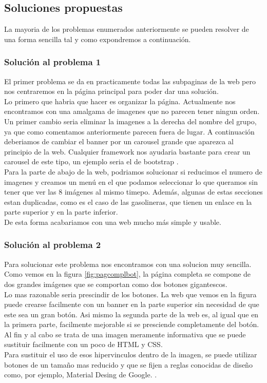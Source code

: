 \documentclass[a4paper,11pt]{article}
\begin{document}
\subsection{Soluciones propuestas}
La mayoria de los problemas enumerados anteriormente se pueden resolver de una forma sencilla tal y como expondremos a continuación.

\subsubsection{Solución al problema 1}
El primer problema se da en practicamente todas las subpaginas de la web pero nos centraremos en la página principal para poder dar una solución.\\
Lo primero que habria que hacer es organizar la página. Actualmente nos encontramos con una amalgama de imagenes que no parecen tener ningun orden.
Un primer cambio seria eliminar la imagenes a la derecha del nombre del grupo, ya que como comentamos anteriormente parecen fuera de lugar.
A continuación deberiamos de cambiar el banner por un carousel grande que aparezca al principio de la web. Cualquier framework nos ayudaria bastante para crear un carousel de este tipo, un ejemplo seria el de bootstrap \cite{bootstrapcarr}.\\
Para la parte de abajo de la web, podriamos solucionar si reducimos el numero de imagenes y creamos un menú en el que podamos seleccionar lo que queramos sin tener que ver las 8 imágenes al mismo timepo. Además, algunas de estas secciones estan duplicadas, como es el caso de las gasolineras, que tienen un enlace en la parte superior y en la parte inferior.\\
De esta forma acabariamos con una web mucho más simple y usable.



\subsubsection{Solución al problema 2}
Para solucionar este problema nos encontramos con una solucion muy sencilla.\\
Como vemos en la figura \ref{fig:pagcomplbot}, la página completa se compone de dos grandes imágenes que se comportan como dos botones gigantescos.\\
Lo mas razonable seria prescindir de los botones. La web que vemos en la figura puede crearse facilmente con un banner en la parte superior sin necesidad de que este sea un gran botón. Asi mismo la segunda parte de la web es, al igual que en la primera parte, facilmente mejorable si se presciende completamente del botón. Al fin y al cabo se trata de una imagen meramente informativa que se puede sustituir facilmente con un poco de HTML y CSS.\\
Para sustituir el uso de esos hipervinculos dentro de la imagen, se puede utilizar botones de un tamaño mas reducido y que se fijen a reglas conocidas de diseño como, por ejemplo, Material Desing de Google. \cite{matdesing}.
\end{document}
